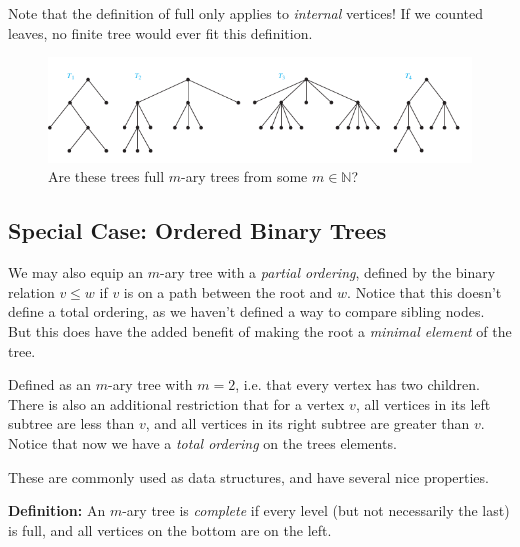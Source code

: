 \documentclass[a4paper,10pt]{report}
\begin{document}
Note that the definition of full only applies to \textit{internal} vertices! If we counted leaves, no finite tree would ever fit this definition.

\begin{figure}[h!]
	\begin{centering}
	\begin{center}
	\includegraphics[width=\linewidth]{./m_ary_exercise.png}
	\caption{Are these trees full $m$-ary trees from some $m\in\mathbb{N}$?}
	\label{fig:??????}
	\end{center}
	\par\end{centering}
\end{figure}

\subsection{Special Case: Ordered Binary Trees}

We may also equip an $m$-ary tree with a \textit{partial ordering}, defined by the binary relation $v\leq w$ if $v$ is on a path between the root and $w$. Notice that this doesn't define a total ordering, as we haven't defined a way to compare sibling nodes. But this does have the added benefit of making the root a \textit{minimal element} of the tree.

Defined as an $m$-ary tree with $m=2$, i.e. that every vertex has two children. There is also an additional restriction that for a vertex $v$, all vertices in its left subtree are less than $v$, and all vertices in its right subtree are greater than $v$. Notice that now we have a \textit{total ordering} on the trees elements.

These are commonly used as data structures, and have several nice properties.

\textbf{Definition: }An $m$-ary tree  is \textit{complete} if every level (but not necessarily the last) is full, and all vertices on the bottom are on the left.
\end{document}
